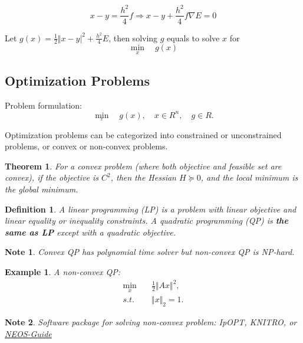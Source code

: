 \documentclass{fancydoc}
\newtheorem{mydef}{Definition}
\newtheorem{thm}{Theorem}
\newtheorem{note}{Note}
\newtheorem{ex}{Example}
\begin{document}
\begin{equation}
x - y = \frac{h^2}{4}f \Rightarrow x - y + \frac{h^2}{4}f\nabla E = 0
\end{equation}

Let $g(x) = \frac{1}{2}\Vert x-y\vert^2 + \frac{h^2}{4}E$, then solving $g$ equals to solve $x$ for
\begin{equation}
\min_{x} \quad g(x)
\end{equation}

\subsection{Optimization Problems}
Problem formulation:
\begin{equation}
\min_{_x} \quad g(x), \quad x\in \!R^n, \quad g\in \!R.
\end{equation}

Optimization problems can be categorized into constrained or unconstrained problems, or convex or non-convex problems. 

\begin{thm}
	For a convex problem (where both objective and feasible set are convex), if the objective is $\!C^2$, then the Hessian $H \succeq 0$, and the local minimum is the global minimum.
\end{thm}

\begin{mydef}
	A linear programming (LP) is a problem with linear objective and linear equality or inequality constraints. A quadratic programming (QP) is {\bf the same as LP} except with a quadratic objective.
\end{mydef}

\begin{note}
	Convex QP has polynomial time solver but non-convex QP is NP-hard.
\end{note}
\begin{ex}
	A non-convex QP: 
	\begin{subequations}
		\begin{align}
		\min_{x} \quad&\frac{1}{2} \Vert Ax \Vert^2, \\
		s.t. \quad & \Vert x \Vert_2 = 1.
		\end{align}
	\end{subequations}
\end{ex}
\begin{note}
	Software package for solving non-convex problem: {\rm IpOPT}, {\rm KNITRO}, or \href{https://neos-guide.org/}{NEOS-Guide} 
\end{note}
\end{document}
